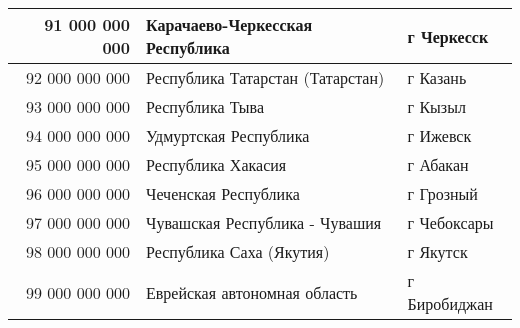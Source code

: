\documentclass[10pt, a4paper, titlepage]{article}
\begin{document}
\begin{center}
\begin{longtable}{|r|p{}|p{}|}
    91 000 000 000 & Карачаево-Черкесская Республика & г Черкесск \\ \hline
    92 000 000 000 & Республика Татарстан (Татарстан) & г Казань \\ \hline
    93 000 000 000 & Республика Тыва & г Кызыл \\ \hline
    94 000 000 000 & Удмуртская Республика & г Ижевск \\ \hline
    95 000 000 000 & Республика Хакасия & г Абакан \\ \hline
    96 000 000 000 & Чеченская Республика & г Грозный \\ \hline
    97 000 000 000 & Чувашская Республика - Чувашия & г Чебоксары \\ \hline
    98 000 000 000 & Республика Саха (Якутия) & г Якутск \\ \hline
    99 000 000 000 & Еврейская автономная область & г Биробиджан \\ \hline

\end{longtable}
\end{center}

\end{document}
